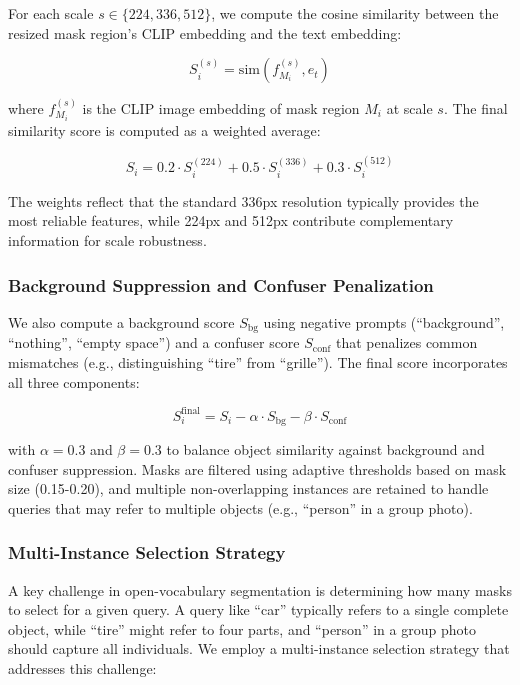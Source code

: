 For each scale $s \in \{224, 336, 512\}$, we compute the cosine similarity between the resized mask region's CLIP embedding and the text embedding:

\begin{equation}
S_i^{(s)} = \text{sim}(f_{M_i}^{(s)}, e_t)
\end{equation}

where $f_{M_i}^{(s)}$ is the CLIP image embedding of mask region $M_i$ at scale $s$. The final similarity score is computed as a weighted average:

\begin{equation}
S_i = 0.2 \cdot S_i^{(224)} + 0.5 \cdot S_i^{(336)} + 0.3 \cdot S_i^{(512)}
\end{equation}

The weights reflect that the standard 336px resolution typically provides the most reliable features, while 224px and 512px contribute complementary information for scale robustness.

\subsubsection{Background Suppression and Confuser Penalization}

We also compute a background score $S_{\text{bg}}$ using negative prompts (``background'', ``nothing'', ``empty space'') and a confuser score $S_{\text{conf}}$ that penalizes common mismatches (e.g., distinguishing ``tire'' from ``grille''). The final score incorporates all three components:

\begin{equation}
S_i^{\text{final}} = S_i - \alpha \cdot S_{\text{bg}} - \beta \cdot S_{\text{conf}}
\end{equation}

with $\alpha = 0.3$ and $\beta = 0.3$ to balance object similarity against background and confuser suppression. Masks are filtered using adaptive thresholds based on mask size (0.15-0.20), and multiple non-overlapping instances are retained to handle queries that may refer to multiple objects (e.g., ``person'' in a group photo).

\subsubsection{Multi-Instance Selection Strategy}

A key challenge in open-vocabulary segmentation is determining how many masks to select for a given query. A query like ``car'' typically refers to a single complete object, while ``tire'' might refer to four parts, and ``person'' in a group photo should capture all individuals. We employ a multi-instance selection strategy that addresses this challenge:

